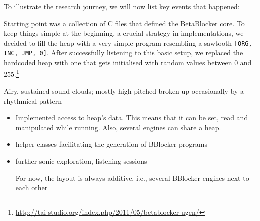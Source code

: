 \documentclass[letterpaper, 12pt]{article}
\begin{document}
To illustrate the research journey, we will now list key events that happened:

Starting point was a collection of C files that defined the BetaBlocker core.
To keep things simple at the beginning, a crucial strategy in implementations, we decided to fill the heap with a very simple program resembling a sawtooth \texttt{[ORG, INC, JMP, 0]}. 
After successfully listening to this basic setup, we replaced the hardcoded heap with one that gets initialised with random values between $0$ and $255$.\footnote{\url{http://tai-studio.org/index.php/2011/05/betablocker-ugen/}}


Airy, sustained sound clouds; mostly high-pitched broken up occasionally by a rhythmical pattern


\begin{itemize}	 
\item Implemented access to heap's data. This means that it can be set, read and manipulated while running. Also, several engines can share a heap. 
\item helper classes facilitating the generation of BBlocker programs 
\item further sonic exploration, listening sessions 

	For now, the layout is always additive, i.e., several BBlocker engines next to each other


\end{itemize}
\end{document}
